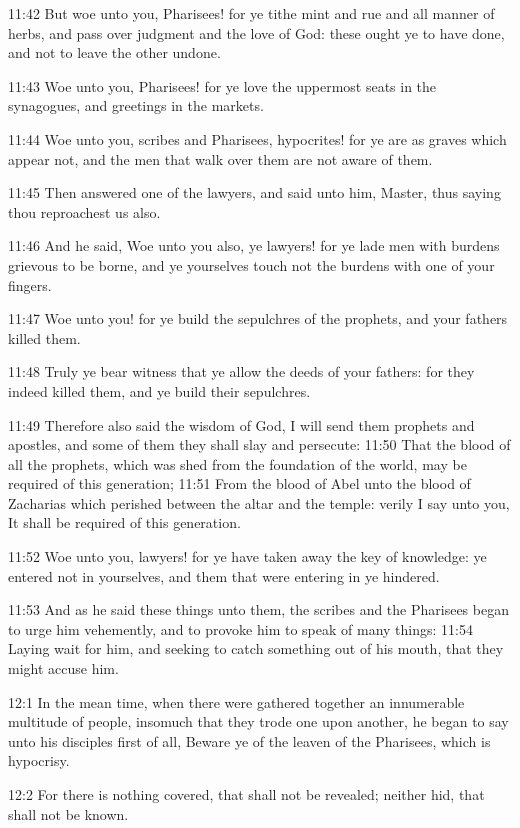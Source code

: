 11:42 But woe unto you, Pharisees! for ye tithe mint and rue and all manner of herbs, and pass over judgment and the love of God: these ought ye to have done, and not to leave the other undone.

11:43 Woe unto you, Pharisees! for ye love the uppermost seats in the synagogues, and greetings in the markets.

11:44 Woe unto you, scribes and Pharisees, hypocrites! for ye are as graves which appear not, and the men that walk over them are not aware of them.

11:45 Then answered one of the lawyers, and said unto him, Master, thus saying thou reproachest us also.

11:46 And he said, Woe unto you also, ye lawyers! for ye lade men with burdens grievous to be borne, and ye yourselves touch not the burdens with one of your fingers.

11:47 Woe unto you! for ye build the sepulchres of the prophets, and your fathers killed them.

11:48 Truly ye bear witness that ye allow the deeds of your fathers: for they indeed killed them, and ye build their sepulchres.

11:49 Therefore also said the wisdom of God, I will send them prophets and apostles, and some of them they shall slay and persecute: 11:50 That the blood of all the prophets, which was shed from the foundation of the world, may be required of this generation; 11:51 From the blood of Abel unto the blood of Zacharias which perished between the altar and the temple: verily I say unto you, It shall be required of this generation.

11:52 Woe unto you, lawyers! for ye have taken away the key of knowledge: ye entered not in yourselves, and them that were entering in ye hindered.

11:53 And as he said these things unto them, the scribes and the Pharisees began to urge him vehemently, and to provoke him to speak of many things: 11:54 Laying wait for him, and seeking to catch something out of his mouth, that they might accuse him.

12:1 In the mean time, when there were gathered together an innumerable multitude of people, insomuch that they trode one upon another, he began to say unto his disciples first of all, Beware ye of the leaven of the Pharisees, which is hypocrisy.

12:2 For there is nothing covered, that shall not be revealed; neither hid, that shall not be known.

